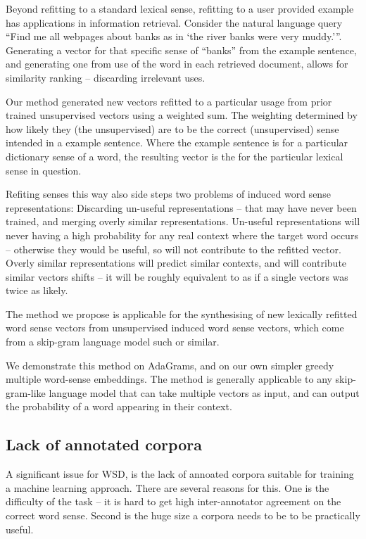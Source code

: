 \documentclass{sig-alternate}
\begin{document}
Beyond refitting to a standard lexical sense, refitting to a user provided example has applications in information retrieval. Consider the natural language query \enquote{Find me all webpages about banks as in \enquote{the river banks were very muddy.}}. Generating a vector for that specific sense of ``banks'' from the example sentence, and generating one from use of the word in each retrieved document, allows for similarity ranking -- discarding irrelevant uses. 




Our method generated new vectors refitted to a particular usage from prior trained unsupervised vectors using a weighted sum. The weighting determined by how likely they (the unsupervised) are to be the correct (unsupervised) sense intended in a example sentence. Where the example sentence is for a particular dictionary sense of a word, the resulting vector is the for the particular lexical sense in question.

Refiting senses this way also side steps two problems of induced word sense representations: Discarding un-useful representations -- that may have never been trained, and merging overly similar representations. Un-useful representations will never having a high probability for any real context where the target word occurs -- otherwise they would be useful, so will not contribute to the refitted vector. Overly similar representations will  predict similar contexts, and will contribute similar vectors shifts -- it will be roughly equivalent to as if a single vectors was twice as likely.


The method we propose is applicable for the synthesising of new lexically refitted word sense vectors from unsupervised induced word sense vectors, which come from a skip-gram language model such or similar.



We demonstrate this method on AdaGrams\parencite{AdaGrams}, and on our own simpler greedy multiple word-sense embeddings. The method is generally applicable to any skip-gram-like language model that can take multiple vectors as input, and can output the probability of a word appearing in their context.

\subsection{Lack of annotated corpora} \label{corpussize}
A significant issue for WSD, is the lack of annoated corpora suitable for training a machine learning approach.
There are several reasons for this. One is the difficulty of the task -- it is hard to get high inter-annotator agreement on the correct word sense. Second is the huge size a corpora needs to be to be practically useful.
\end{document}
